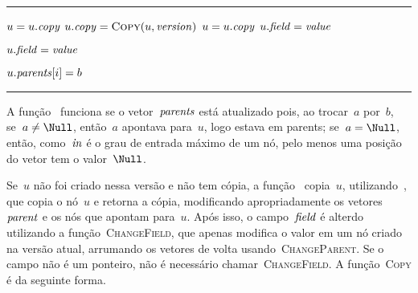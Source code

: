 \documentclass[../../main.tex]{subfiles}
\begin{document}
\vspace{1em}
\hrule
\begin{algorithmic}[1]

		\State $u = u.\mathit{copy}$
	\EndIf
		\State $u.\V{copy} = \Call{Copy}{u, \V{version}}$ \label{line:modify:copy}
		\State $u = u.\mathit{copy}$
	\EndIf
		\State {}
	\Else
		\State $u.\mathit{field} = \mathit{value}$
	\EndIf
\EndFunction

		\State {}
	\EndIf
	\State $u.\mathit{field} = \mathit{value}$
		\State {}
	\EndIf
\EndFunction

			\State $u.\mathit{parents}[i] = b$
			\State \Return
		\EndIf
	\EndFor
\EndFunction

\end{algorithmic}
\hrule
\vspace{1em}

A função~ funciona se o vetor~$\mathit{parents}$ está atualizado pois, ao trocar~$a$ por~$b$, se~$a \neq \Null$, então~$a$ apontava para~$u$, logo estava em parents; se~$a = \Null$, então, como~$\mathit{in}$ é o grau de entrada máximo de um nó, pelo menos uma posição do vetor tem o valor~$\Null$.

Se~$u$ não foi criado nessa versão e não tem cópia, a função~ copia~$u$, utilizando~, que copia o nó~$u$ e retorna a cópia, modificando apropriadamente os vetores~$\mathit{parent}$ e os nós que apontam para~$u$. Após isso, o campo~$\mathit{field}$ é alterdo utilizando a função~\textsc{ChangeField}, que apenas modifica o valor em um nó criado na versão atual, arrumando os vetores de volta usando~\textsc{ChangeParent}. Se o campo não é um ponteiro, não é necessário chamar~\textsc{ChangeField}.
A função~\textsc{Copy} é da seguinte forma.
\end{document}
